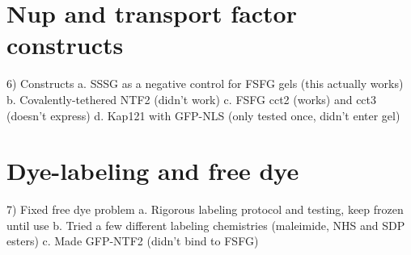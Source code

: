 \section{Nup and transport factor constructs}
6)	Constructs
a.	SSSG as a negative control for FSFG gels (this actually works)
b.	Covalently-tethered NTF2 (didn’t work)
c.	FSFG cct2 (works) and cct3 (doesn’t express)
d.	Kap121 with GFP-NLS (only tested once, didn’t enter gel)
\section{Dye-labeling and free dye}
7)	Fixed free dye problem
a.	Rigorous labeling protocol and testing, keep frozen until use
b.	Tried a few different labeling chemistries (maleimide, NHS and SDP esters)
c.	Made GFP-NTF2 (didn’t bind to FSFG)
